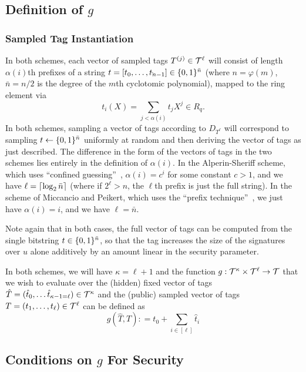 \subsection{Definition of $g$}
\label{sec:tag-inst}


\subsubsection{Sampled Tag Instantiation}
\label{sec:tag-inst-real}

In both schemes, each vector of sampled tags
$T^{(j)} \in \mathcal{T}^{\ell}$ will consist of length $\alpha(i)$th prefixes
of a string $t = [t_0,\ldots, t_{\bar{}n-1}] \in \{0,1\}^{\bar{n}}$
(where $n=\varphi(m)$, $\bar{n}=n/2$ is the degree of the $m$th
cyclotomic polynomial), mapped to the ring element via
\[t_{i}(X) = \sum_{j < \alpha(i)} t_jX^{j} \in R_q.\]  In both schemes,
sampling a vector of tags according to $D_{T^{\ell}}$ will correspond
to sampling $t \gets \{0,1\}^{\bar{n}}$ uniformly at random and then
deriving the vector of tags as just described. The difference in the
form of the vectors of tags in the two schemes lies entirely in the
definition of $\alpha(i)$. In the Alperin-Sheriff scheme, which uses
``confined guessing''~\cite{bohl2013confined}, $\alpha(i) = c^i$ for
some constant $c > 1$, and we have $\ell = \lceil\log_2{\bar{n}}\rceil$
(where if $2^\ell > n$, the $\ell$th prefix is just the full string).
In the scheme of Miccancio and Peikert, which uses the ``prefix
technique''~\cite{DBLP:conf/eurocrypt/HohenbergerW09}, we just have
$\alpha(i)=i$, and we have $\ell=\bar{n}$.

Note again that in both cases, the full vector of tags can be computed from
the single bitstring $t \in \{0,1\}^{\bar{n}}$, so that the tag increases the
size of the signatures over $u$ alone additively by an amount linear in the security
parameter. 



In both schemes, we will have $\kappa = \ell+1$ and the function $g: \mathcal{T}^{\kappa} \times \mathcal{T}^{\ell}
\to \mathcal{T}$ that we wish to evaluate over the
(hidden) fixed vector of tags $\hat{T} = (\hat{t}_0, \ldots \hat{t}_{\kappa-1=\ell}) \in \mathcal{T}^{\kappa}$ and the (public) sampled
vector of tags $T = (t_1, \ldots, t_{\ell}) \in \mathcal{T}^{\ell}$ can be defined as
\[g(\hat{T}, T) : = t_0 + \sum_{i \in [\ell]}\hat{t}_i\]



\subsection{Conditions on $g$ For Security}
\label{sec:cond-g-secu}

